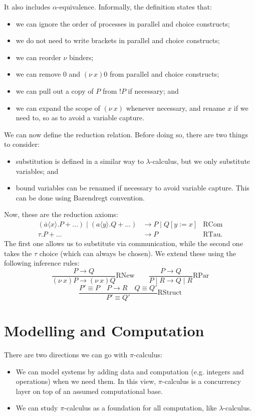 \documentclass[a4paper, openany]{memoir}
\theoremstyle{definition}
\begin{document}
    It also includes $\alpha$-equivalence. Informally, the definition states that:
    \begin{itemize}
        \item we can ignore the order of processes in parallel and choice constructs;
        \item we do not need to write brackets in parallel and choice constructs;
        \item we can reorder $\nu$ binders;
        \item we can remove $0$ and $(\nu \  x) 0$ from parallel and choice constructs;
        \item we can pull out a copy of $P$ from $!P$ if necessary; and
        \item we can expand the scope of $(\nu \ x)$ whenever necessary, and rename $x$ if we need to, so as to avoid a variable capture.
    \end{itemize}

    We can now define the reduction relation. Before doing so, there are two things to consider:
    \begin{itemize}
        \item substitution is defined in a similar way to $\lambda$-calculus, but we only substitute variables; and
        \item bound variables can be renamed if necessary to avoid variable capture. This can be done using Barendregt convention.
    \end{itemize}
    Now, these are the reduction axioms:
    \begin{align*}
        (\overline{a} \langle x \rangle.P + \dots) \mid (a \langle y \rangle.Q + \dots) &\to P \mid Q[ y:= x] & \textrm{RCom} \\
        \tau.P + \dots &\to P & \textrm{RTau}.
    \end{align*}
    The first one allows us to substitute via communication, while the second one takes the $\tau$ choice (which can always be chosen). We extend these using the following inference rules:
    \[\frac{P \to Q}{(\nu \ x)P \to (\nu \ x)Q} \textrm{RNew} \qquad \frac{P \to Q}{P \mid R \to Q \mid R} \textrm{RPar}\]
    \[\frac{P' \equiv P \quad P \to R \quad Q \equiv Q'}{P' \equiv Q'} \textrm{RStruct}\]
    \newpage

    \section{Modelling and Computation}
    There are two directions we can go with $\pi$-calculus:
    \begin{itemize}
        \item We can model systems by adding data and computation (e.g. integers and operations) when we need them. In this view, $\pi$-calculus is a concurrency layer on top of an assumed computational base.
        \item We can study $\pi$-calculus as a foundation for all computation, like $\lambda$-calculus.
    \end{itemize}
    
\end{document}
